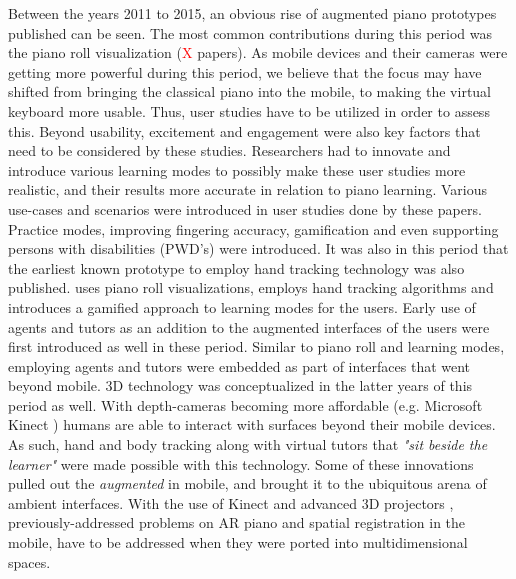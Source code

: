 \documentclass[sigchi, review]{acmart}
\newcommand{\red}[1]{\textcolor{red}{#1}}
\begin{document}
Between the years 2011 to 2015, an obvious rise of augmented piano prototypes published can be seen. The most common contributions during this period was the piano roll visualization (\red{X} papers). As mobile devices and their cameras were getting more powerful during this period, we believe that the focus may have shifted from bringing the classical piano into the mobile, to making the virtual keyboard more usable. Thus, user studies have to be utilized in order to assess this. Beyond usability, excitement and engagement were also key factors that need to be considered by these studies. Researchers had to innovate and introduce various learning modes to possibly make these user studies more realistic, and their results more accurate in relation to piano learning. Various use-cases and scenarios were introduced in user studies done by these papers. Practice modes, improving fingering accuracy, gamification and even supporting persons with disabilities (PWD's) were introduced. It was also in this period that the earliest known prototype to employ hand tracking \cite{huang2011piano} technology was also published. \citet{weing2013piano} uses piano roll visualizations, employs hand tracking algorithms and introduces a gamified approach to learning modes for the users. Early use of agents and tutors as an addition to the augmented interfaces of the users were first introduced as well in these period. Similar to piano roll and learning modes, employing agents and tutors were embedded as part of interfaces that went beyond mobile. 3D technology was conceptualized in the latter years of this period as well. With depth-cameras becoming more affordable (e.g. Microsoft Kinect \cite{zhang2012microsoft}) humans are able to interact with surfaces beyond their mobile devices. As such, hand and body tracking along with virtual tutors that \textit{"sit beside the learner"} were made possible with this technology. Some of these innovations pulled out the \textit{augmented} in mobile, and brought it to the ubiquitous arena of ambient interfaces. With the use of Kinect and advanced 3D projectors \cite{yang2012augmented}, previously-addressed problems on AR piano and spatial registration in the mobile, have to be addressed when they were ported into multidimensional spaces. 
\end{document}
